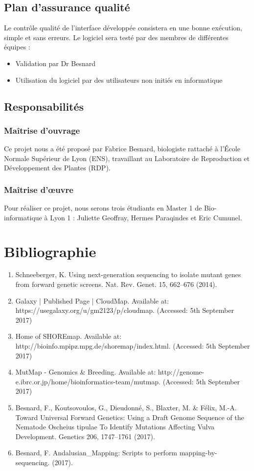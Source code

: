 \documentclass[12pt]{article}
\begin{document}
\subsection{Plan d'assurance qualité}

Le contrôle qualité de l'interface développée consistera en une bonne exécution, simple et sans erreurs. Le logiciel sera testé par des membres de différentes équipes :

\begin{itemize}
\item Validation par Dr Besnard
\item Utilisation du logiciel par des utilisateurs non initiés en informatique
\end{itemize}

\subsection{Responsabilités}
\subsubsection{Maîtrise d'ouvrage}

Ce projet nous a été proposé par Fabrice Besnard, biologiste rattaché à l’École Normale Supérieur de Lyon (ENS), travaillant au Laboratoire de Reproduction et Développement des Plantes (RDP).

\subsubsection{Maîtrise d’œuvre}

Pour réaliser ce projet, nous serons trois étudiants en Master 1 de Bio-informatique à Lyon 1 : Juliette Geoffray, Hermes Paraqindes et Eric Cumunel.

\section{Bibliographie}
\begin{enumerate}
\item Schneeberger, K. Using next-generation sequencing to isolate mutant genes from forward genetic screens. Nat. Rev.
Genet. 15, 662–676 (2014).
\item Galaxy | Published Page | CloudMap. Available at: https://usegalaxy.org/u/gm2123/p/cloudmap. (Accessed: 5th
September 2017)
\item Home of SHOREmap. Available at: http://bioinfo.mpipz.mpg.de/shoremap/index.html. (Accessed: 5th September
2017)
\item MutMap - Genomics \& Breeding. Available at: http://genome-e.ibrc.or.jp/home/bioinformatics-team/mutmap.
(Accessed: 5th September 2017)
\item Besnard, F., Koutsovoulos, G., Dieudonné, S., Blaxter, M. \& Félix, M.-A. Toward Universal Forward Genetics:
Using a Draft Genome Sequence of the Nematode Oscheius tipulae To Identify Mutations Affecting Vulva
Development. Genetics 206, 1747–1761 (2017).
\item Besnard, F. Andalusian\_Mapping: Scripts to perform mapping-by-sequencing. (2017).
\end{enumerate}
\end{document}
